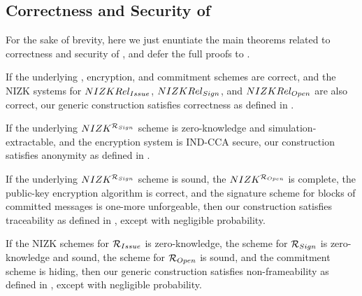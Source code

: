 \subsection{Correctness and Security of \GSACGen}
\label{ssec:security-gsac}

For the sake of brevity, here we just enuntiate the main theorems related to
correctness and security of \GSAC, and defer the full proofs to
.

\begin{theorem}
  \label{thm:correctness-gsac}
  If the underlying \SBCM, encryption, and commitment schemes are correct, and
  the NIZK systems for $NIZKRel_{Issue}$, $NIZKRel_{Sign}$, and $NIZKRel_{Open}$
  are also correct, our generic construction \GSACGen
  satisfies correctness as defined in .
\end{theorem}

\begin{theorem}
  \label{thm:iss-anonymity-gsac}
\end{theorem}

\begin{theorem}
  \label{thm:sig-anonymity-gsac}
  If the underlying $NIZK^{\mathcal{R}_{Sign}}$ scheme is zero-knowledge and
  simulation-extractable, and the encryption system is IND-CCA secure,
  our \GSACGen construction satisfies anonymity as defined in
  .
\end{theorem}

\begin{theorem}
  \label{thm:trace-gsac}
  If the underlying $NIZK^{\mathcal{R}_{Sign}}$ scheme is sound, the
  $NIZK^{\mathcal{R}_{Open}}$ is  complete, the public-key encryption algorithm
  is correct, and the signature scheme for blocks of committed messages is
  one-more unforgeable, then our \GSACGen construction satisfies traceability as
  defined in , except with negligible
  probability.
\end{theorem}

\begin{theorem}
  \label{thm:frame-gsac}
  If the NIZK schemes for $\mathcal{R}_{Issue}$ is zero-knowledge, the scheme for
  $\mathcal{R}_{Sign}$ is zero-knowledge and sound, the scheme for $\mathcal{R}_{Open}$ is
  sound, and the commitment scheme \C is hiding, then our generic \GSACGen
  construction satisfies non-frameability as defined in ,
  except with negligible probability.
\end{theorem}

